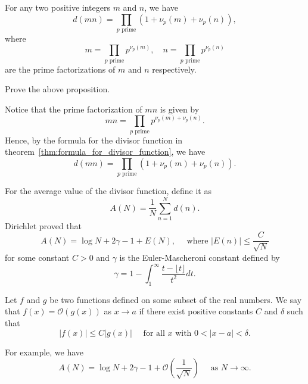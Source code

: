 \documentclass{elegantbook}
\begin{document}
\begin{proposition} \label{prop:multiplicativity_of_divisor_function}
  For any two positive integers \(m\) and \(n\), we have
  \[
    d(mn) = \prod_{p \text{ prime}} (1 + \nu_p(m) + \nu_p(n)),
  \]
  where
  \[
    m = \prod_{p \text{ prime}} p^{\nu_p(m)}, \quad n = \prod_{p \text{ prime}} p^{\nu_p(n)}
  \]
  are the prime factorizations of \(m\) and \(n\) respectively.
\end{proposition}

\begin{exercise}
  Prove the above proposition.
\end{exercise}

\begin{solution}
  Notice that the prime factorization of \(mn\) is given by
  \[
    mn = \prod_{p \text{ prime}} p^{\nu_p(m) + \nu_p(n)}.
  \]
  Hence, by the formula for the divisor function in theorem~\ref{thm:formula_for_divisor_function}, we have
  \[
    d(mn) = \prod_{p \text{ prime}} (1 + \nu_p(m) + \nu_p(n)).
  \]
\end{solution}

\begin{remark}
  For the average value of the divisor function, define it as
  \[
    A(N) = \frac{1}{N} \sum_{n=1}^{N} d(n).
  \]
  Dirichlet proved that
  \[
    A(N) = \log N + 2\gamma - 1 + E(N), \quad \text{ where } |E(n)| \leq \frac{C}{\sqrt{N}}
  \]
  for some constant \(C > 0\) and \(\gamma\) is the Euler-Mascheroni constant defined by
  \[
    \gamma = 1 - \int_1^{\infty} \frac{t-\lfloor t \rfloor}{t^2} dt.
  \]
\end{remark}

\begin{definition} \label{def:big_O_notation}
  Let \(f\) and \(g\) be two functions defined on some subset of the real numbers. We say that \(f(x) = \mathcal{O}(g(x))\) as \(x \to a\) if there exist positive constants \(C\) and \(\delta\) such that
  \[
    |f(x)| \leq C |g(x)| \quad \text{ for all } x \text{ with } 0 < |x - a| < \delta.
  \]

  For example, we have
  \[
    A(N) = \log N + 2\gamma - 1 + \mathcal{O}\left( \frac{1}{\sqrt{N}} \right) \quad \text{ as } N \to \infty.
  \]
\end{definition}
\end{document}
